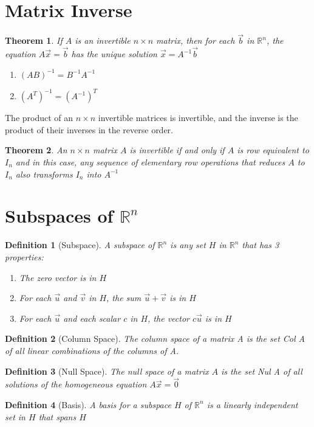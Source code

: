 \documentclass[oneside]{report}
\newtheorem{theorem}{Theorem}[section]
\newtheorem{definition}{Definition}[section]
\begin{document}
\section{Matrix Inverse}
\begin{theorem}
  If $A$ is an invertible $n \times n$ matrix, then for each $\vec{b}$ in $\mathbb{R}^n$, the equation $A\vec{x} = \vec{b}$ has the unique solution $\vec{x} = A^{-1} \vec{b}$
\end{theorem}

\begin{enumerate}
  \item $(AB)^{-1} = B^{-1}A^{-1}$
  \item $(A^T)^{-1} = (A^{-1})^T$
\end{enumerate}

The product of an $n \times n$ invertible matrices is invertible, and the inverse is the
product of their inverses in the reverse order.

\begin{theorem}
  An $n \times n$ matrix $A$ is invertible if and only if $A$ is row equivalent to $I_n$ and in
this case, any sequence of elementary row operations that reduces $A$ to $I_n$ also transforms $I_n$ into $A^{-1}$
\end{theorem}

\section{Subspaces of $\mathbb{R}^n$}

\begin{definition}[Subspace]
  A subspace of $\mathbb{R}^n$ is any set $H$ in $\mathbb{R}^n$ that has 3 properties:
  \begin{enumerate}
    \item The zero vector is in $H$
    \item For each $\vec{u}$ and $\vec{v}$ in $H$, the sum $\vec{u} + \vec{v}$ is in $H$
    \item For each $\vec{u}$ and each scalar $c$ in $H$, the vector $c\vec{u}$ is in $H$
  \end{enumerate}
\end{definition}

\begin{definition} [Column Space]
 The column space of a matrix A is the set Col A of all linear combinations of the columns of A.
\end{definition}

\begin{definition} [Null Space]
  The null space of a matrix $A$ is the set Nul A of all solutions of the homogeneous
equation $A\vec{x} = \vec{0}$
\end{definition}

\begin{definition} [Basis]
  A basis for a subspace $H$ of $\mathbb{R}^n$ is a linearly independent set in $H$ that spans $H$
\end{definition}
\end{document}
